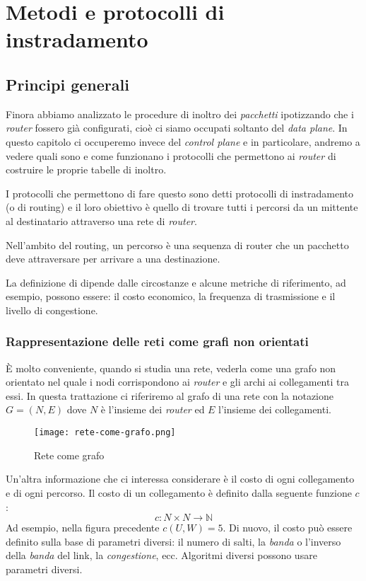 \chapter{Metodi e protocolli di instradamento}
\section{Principi generali}
Finora abbiamo analizzato le procedure di inoltro dei \emph{pacchetti} ipotizzando
che i \emph{router} fossero già configurati, cioè ci siamo occupati soltanto del
\emph{data plane}. In questo capitolo ci occuperemo invece del \emph{control plane}
e in particolare, andremo a vedere quali sono e come funzionano i protocolli che
permettono ai \emph{router} di costruire le proprie tabelle di inoltro.

I protocolli che permettono di fare questo sono detti protocolli di instradamento
(o di routing) e il loro obiettivo è quello di trovare tutti i 
percorsi da un mittente al destinatario attraverso una rete di \emph{router}.

\begin{definition}[Percorso]
    Nell'ambito del routing, un percorso è una sequenza di router che un
    pacchetto deve attraversare per arrivare a una destinazione.
\end{definition}\noindent
La definizione di  dipende dalle circostanze e alcune metriche
di riferimento, ad esempio, possono essere: il costo economico, la frequenza di
trasmissione e il livello di congestione.

\subsection{Rappresentazione delle reti come grafi non orientati}
È molto conveniente, quando si studia una rete, vederla come una grafo non
orientato nel quale i nodi corrispondono ai \emph{router} e gli archi ai
collegamenti tra essi. In questa trattazione ci riferiremo al grafo di una rete
con la notazione $G=(N,E)$ dove $N$ è l'insieme dei \emph{router} ed $E$ l'insieme
dei collegamenti.

\begin{figure}[h!]
    \centering
    \texttt{[image: rete-come-grafo.png]}
    \caption{Rete come grafo}
\end{figure}\noindent
Un'altra informazione che ci interessa considerare è il costo di ogni collegamento
e di ogni percorso. Il costo di un collegamento è definito dalla seguente
funzione $c$:
\[c:N\times N\to\mathbb{N}\]
Ad esempio, nella figura precedente $c(U,W)=5$. Di nuovo, il costo può essere
definito sulla base di parametri diversi: il numero di salti, la \emph{banda} o
l'inverso della \emph{banda} del link, la \emph{congestione}, ecc. Algoritmi
diversi possono usare parametri diversi.

